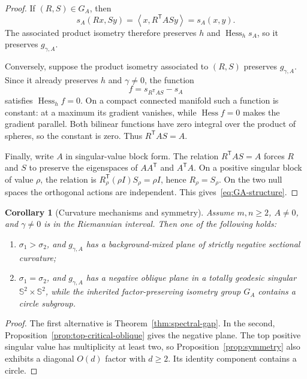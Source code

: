 \documentclass[11pt]{amsart}
\newtheorem{corollary}[theorem]{Corollary}
\theoremstyle{definition}
\theoremstyle{remark}
\DeclareMathOperator{\Hess}{Hess}
\newcommand{\Sph}{\mathbb S}
\newcommand{\ip}[2]{\left\langle #1,#2\right\rangle}
\begin{document}
\begin{proof}
If $(R,S)\in G_A$, then
\[
 s_A(Rx,Sy)=\ip{x}{R^{\mathsf T}ASy}=s_A(x,y).
\]
The associated product isometry therefore preserves $h$ and
$\Hess_hs_A$, so it preserves $g_{\gamma,A}$.

Conversely, suppose the product isometry associated to $(R,S)$
preserves $g_{\gamma,A}$.  Since it already preserves $h$ and
$\gamma\neq0$, the function
\[
 f=s_{R^{\mathsf T}AS}-s_A
\]
satisfies $\Hess_h f=0$.  On a compact connected manifold such a
function is constant: at a maximum its gradient vanishes, while
$\Hess f=0$ makes the gradient parallel.  Both bilinear functions have
zero integral over the product of spheres, so the constant is zero.
Thus $R^{\mathsf T}AS=A$.

Finally, write $A$ in singular-value block form.  The relation
$R^{\mathsf T}AS=A$ forces $R$ and $S$ to preserve the eigenspaces of
$AA^{\mathsf T}$ and $A^{\mathsf T}A$.  On a positive singular block
of value $\rho$, the relation is
$R_\rho^{\mathsf T}(\rho I)S_\rho=\rho I$, hence
$R_\rho=S_\rho$.  On the two null spaces the orthogonal actions are
independent.  This gives~\eqref{eq:GA-structure}.
\end{proof}

\begin{corollary}[Curvature mechanisms and symmetry]
\label{cor:curvature-symmetry}
Assume $m,n\geq2$, $A\neq0$, and $\gamma\neq0$ is in the Riemannian
interval.  Then one of the following holds:
\begin{enumerate}
 \item $\sigma_1>\sigma_2$, and $g_{\gamma,A}$ has a background-mixed
 plane of strictly negative sectional curvature;
 \item $\sigma_1=\sigma_2$, and $g_{\gamma,A}$ has a negative oblique
 plane in a totally geodesic singular $\Sph^2\times\Sph^2$, while the
 inherited factor-preserving isometry group $G_A$ contains a circle
 subgroup.
\end{enumerate}
\end{corollary}

\begin{proof}
The first alternative is Theorem~\ref{thm:spectral-gap}.  In the
second, Proposition~\ref{prop:top-critical-oblique} gives the negative
plane.  The top positive singular value has multiplicity at least two,
so Proposition~\ref{prop:symmetry} also exhibits a diagonal $O(d)$
factor with $d\geq2$.  Its identity component contains a circle.
\end{proof}
\end{document}
